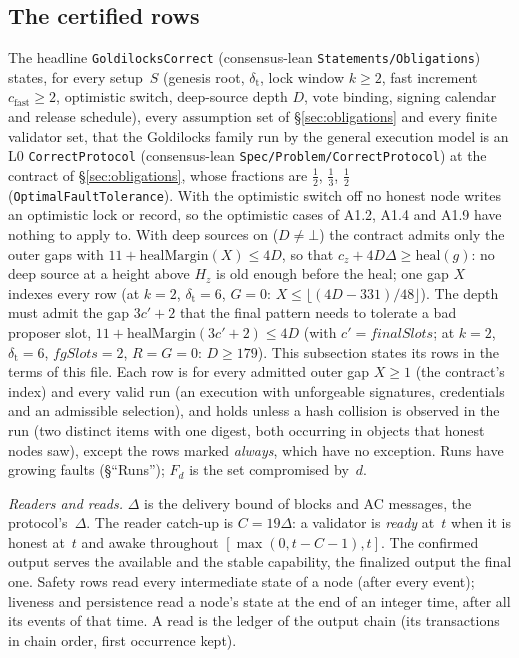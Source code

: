 \documentclass{article}
\begin{document}
\subsection{The certified rows}\label{sec:certified-rows}

\begin{sloppypar}
The headline \texttt{GoldilocksCorrect} (consensus-lean
\texttt{Statements/Obligations}) states, for every setup~$S$ (genesis root,
$\delta_{\mathrm t}$, lock window $k\geq2$, fast increment $c_{\mathrm{fast}}\geq2$,
optimistic switch, deep-source depth $D$, vote binding,
signing calendar and release schedule),
every assumption set
of \S\ref{sec:obligations} and every finite validator
set, that the Goldilocks family run by the general execution model is an L0
\texttt{CorrectProtocol} (consensus-lean
\texttt{Spec/Problem/CorrectProtocol}) at the contract of
\S\ref{sec:obligations}, whose fractions are $\tfrac12$, $\tfrac13$,
$\tfrac12$ (\texttt{OptimalFaultTolerance}).  With the optimistic switch off no
honest node writes an optimistic lock or record, so the optimistic cases of
A1.2, A1.4 and A1.9 have nothing to apply to.  With deep sources on
($D\neq\bot$) the contract admits only the outer gaps with
$11+\mathrm{healMargin}(X)\leq4D$, so that $c_z+4D\Delta\geq\mathrm{heal}(g)$: no
deep source at a height above $H_z$ is old enough before the heal; one gap $X$
indexes every row (at $k=2$, $\delta_{\mathrm t}=6$, $G=0$: $X\leq\lfloor(4D-331)/48\rfloor$).
The depth must admit the gap $3c'+2$ that the final pattern needs to tolerate a
bad proposer slot, $11+\mathrm{healMargin}(3c'+2)\leq4D$ (with
$c'=\mathit{finalSlots}$; at $k=2$, $\delta_{\mathrm t}=6$, $\mathit{fgSlots}=2$,
$R=G=0$: $D\geq179$).
This subsection states its rows in the terms of
this file.  Each row is for every admitted outer gap $X\geq1$ (the contract's index)
and every valid run (an execution with unforgeable signatures,
credentials and an admissible selection), and holds unless a hash collision is observed in the run
(two distinct items with one digest, both occurring in objects that honest
nodes saw), except the rows marked \emph{always}, which have no exception.
Runs have growing faults (\S``Runs''); $F_d$ is the set compromised by~$d$.
\end{sloppypar}

\emph{Readers and reads.}  $\Delta$ is the delivery bound of blocks and AC
messages, the protocol's~$\Delta$.  The reader catch-up is $C=19\Delta$: a
validator is \emph{ready} at~$t$ when it is honest at~$t$ and awake
throughout $[\max(0,t-C-1),t]$.  The confirmed output serves the available
and the stable capability, the finalized output the final one.  Safety rows
read every intermediate state of a node (after every event); liveness and
persistence read a node's state at the end of an integer time, after all
its events of that time.  A read is the ledger of the output chain (its
transactions in chain order, first occurrence kept).
\end{document}
